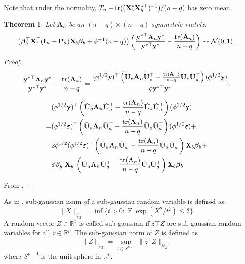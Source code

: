 \documentclass[11pt]{article}
\DeclareMathOperator{\mytr}{tr}
\DeclareMathOperator{\myE}{E}
\newcommand{\By}{\mathbf{y}}    \newcommand{\Bz}{\mathbf{z}}
\newcommand{\BA}{\mathbf{A}}    \newcommand{\BB}{\mathbf{B}}    \newcommand{\BC}{\mathbf{C}}    \newcommand{\BD}{\mathbf{D}}    \newcommand{\BE}{\mathbf{E}}    \newcommand{\BF}{\mathbf{F}}    \newcommand{\BG}{\mathbf{G}}    \newcommand{\BH}{\mathbf{H}}    \newcommand{\BI}{\mathbf{I}}    \newcommand{\BJ}{\mathbf{J}}    \newcommand{\BK}{\mathbf{K}}    \newcommand{\BL}{\mathbf{L}}
\newcommand{\bfsym}[1]{\ensuremath{\boldsymbol{#1}}}
\def\bbeta{\bfsym \beta}
\theoremstyle{plain}
\newtheorem{theorem}{\quad\quad Theorem}
\theoremstyle{definition}
\theoremstyle{remark}
\begin{document}
Note that under the normality, $T_n- \mytr ((\BX_b^* \BX_b^{*\top})^{-1})/(n-q)$ has zero mean.

\begin{theorem}\label{generalTheorem}
    Let $\BA_n$ be an $(n-q)\times (n-q)$ symmetric matrix.
\begin{equation*}
    \left(
    \bbeta_b^\top \BX_b^\top (\BI_n-\BP_a) \BX_b \bbeta_b
    + \phi^{-1}(n-q)
\right)
    \left(
        \frac{\By^{*\top} \BA_n \By^*}{\By^{*\top} \By^*} -\frac{\mytr (\BA_n)}{n-q}
    \right)
    \rightsquigarrow \mathcal N(0,1).
\end{equation*}
\end{theorem}
\begin{proof}
    \begin{equation*}
        \frac{\By^{*\top} \BA_n \By^*}{\By^{*\top} \By^*} -\frac{\mytr (\BA_n)}{n-q}
        =
        \frac{(\phi^{1/2}\By)^{\top}\left( \tilde{\BU}_a\BA_n \tilde{\BU}_a^\top
                -\frac{\mytr (\BA_n)}{n-q} \tilde{\BU}_a\tilde{\BU}_a^\top
        \right) (\phi^{1/2}\By)}{\phi\By^{*\top} \By^*}.
    \end{equation*}


\begin{equation*}
    \begin{split}
&(\phi^{1/2}\By)^{\top}\left( \tilde{\BU}_a\BA_n \tilde{\BU}_a^\top
                -\frac{\mytr (\BA_n)}{n-q} \tilde{\BU}_a\tilde{\BU}_a^\top
        \right) (\phi^{1/2}\By)
        \\
        =&
(\phi^{1/2}\bepsilon)^{\top}\left( \tilde{\BU}_a\BA_n \tilde{\BU}_a^\top
                -\frac{\mytr (\BA_n)}{n-q} \tilde{\BU}_a\tilde{\BU}_a^\top
        \right) (\phi^{1/2}\bepsilon)
        +
        \\
        &2\phi^{1/2} (\phi^{1/2}\bepsilon)^{\top}\left( \tilde{\BU}_a\BA_n \tilde{\BU}_a^\top
                -\frac{\mytr (\BA_n)}{n-q} \tilde{\BU}_a\tilde{\BU}_a^\top
        \right) \BX_b \bbeta_b
        +
        \\
        & \phi
\bbeta_b^\top \BX_b^\top \left( \tilde{\BU}_a\BA_n \tilde{\BU}_a^\top
                -\frac{\mytr (\BA_n)}{n-q} \tilde{\BU}_a\tilde{\BU}_a^\top
        \right) \BX_b \bbeta_b
    \end{split}
\end{equation*}

    From \cite[Theorem 5.1]{jiang1996reml},
\end{proof}


As in \cite{Roman2018}, sub-gaussian norm of a sub-gaussian random variable is defined as
\begin{equation*}
    \|X\|_{\psi_2} = \inf \{t>0: \myE \exp(X^2/t^2) \leq 2\}.
\end{equation*}
A random vector $Z\in \mathbb R^p$ is called sub-gaussian if $z\top Z$ are sub-gaussian random variables for all $z\in \mathbb R^p$.
The sub-gaussian norm of $Z$ is defined as
\begin{equation*}
    \|Z\|_{\psi_2}= \sup_{z\in S^{p-1}} \|z^\top Z\|_{\psi_2},
\end{equation*}
where $S^{p-1}$ is the unit sphere in $\mathbb R^p$.
\end{document}
